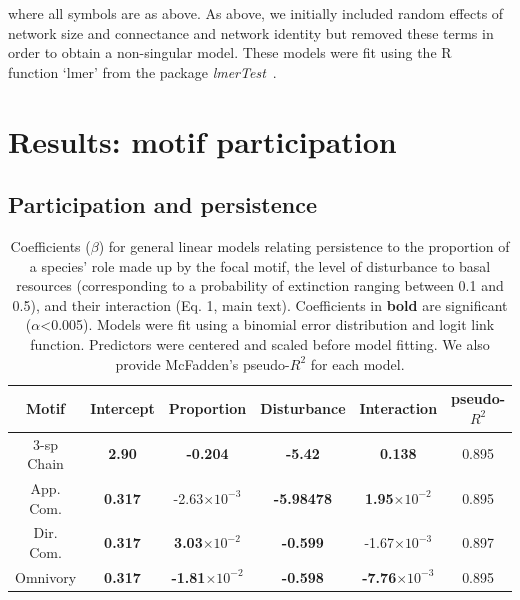 \documentclass[12pt]{article}
\begin{document}
\begin{spacing}{2.0}
        \noindent where all symbols are as above. 
        As above, we initially included random effects of network size and connectance and network identity but removed these terms in order to obtain a non-singular model.
        These models were fit using the R~\citep{R} function `lmer' from the package \emph{lmerTest}~\citep{lmerTest}.

    		
\clearpage


\section{Results: motif participation} 

    \subsection{Participation and persistence}


    \begin{table}[ht!]
        \centering
        \caption{Coefficients ($\beta$) for general linear models relating persistence to the proportion of a species' role made up by the focal motif, the level of disturbance to basal resources (corresponding to a probability of extinction ranging between 0.1 and 0.5), and their interaction  (Eq. 1, main text). Coefficients in \textbf{bold} are significant ($\alpha$\textless0.005). Models were fit using a binomial error distribution and logit link function. Predictors were centered and scaled before model fitting. We also provide McFadden's pseudo-$R^2$ for each model.}
        \label{tab:proportion}                \footnotesize
        \begin{tabular}{c|c c c c | c }
        Motif & Intercept & Proportion & Disturbance & Interaction & pseudo-$R^2$  \\
        \hline
        3-sp Chain & \textbf{2.90} & \textbf{-0.204} & \textbf{-5.42} & \textbf{0.138} & 0.895 \\
        App. Com. & \textbf{0.317} & -2.63$\times10^{-3}$ & \textbf{-5.98478} & \textbf{1.95$\times10^{-2}$} & 0.895 \\
        Dir. Com. & \textbf{0.317} & \textbf{3.03$\times10^{-2}$} & \textbf{-0.599} & -1.67$\times10^{-3}$ &  0.897 \\
        Omnivory & \textbf{0.317} & \textbf{-1.81$\times10^{-2}$} & \textbf{-0.598} & \textbf{-7.76$\times10^{-3}$} & 0.895 \\
        \end{tabular}
    \end{table}        


\end{spacing}
\end{document}
